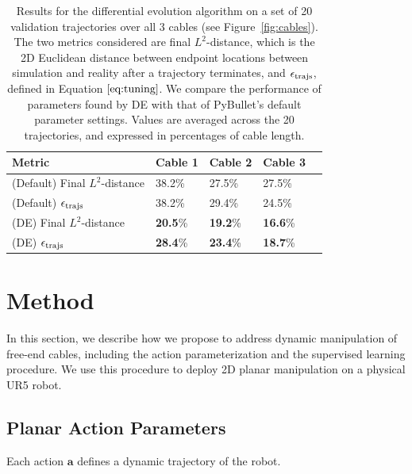 \documentclass[letterpaper, 10 pt, conference]{ieeeconf}  %
\newcommand{\ba}{\mathbf{a}}
\begin{document}
\begin{table}[t]
  \setlength\tabcolsep{5.0pt}
  \centering
  \caption{
    Results for the differential evolution algorithm on a set of 20 validation trajectories over all 3 cables (see Figure~\ref{fig:cables}). The two metrics considered are final $L^2$-distance, which is the 2D Euclidean distance between endpoint locations between simulation and reality after a trajectory terminates, and $\epsilon_{\rm trajs}$, defined in Equation $\ref{eq:tuning}$. We compare the performance of parameters found by DE with that of PyBullet's default parameter settings. Values are averaged across the 20 trajectories, and expressed in percentages of cable length.
  }
  \small
  \begin{tabular}{@{}lllll}
  \toprule
  Metric & Cable 1  & Cable 2  & Cable 3  \\
  \midrule
  (Default) Final $L^2$-distance & 38.2\% & 27.5\% & 27.5\% \\
  (Default) $\epsilon_{\rm trajs}$ & 38.2\% & 29.4\% & 24.5\% \\
  (DE) Final $L^2$-distance & \textbf{20.5}\%  & \textbf{19.2}\% & \textbf{16.6}\% \\
  (DE) $\epsilon_{\rm trajs}$ & \textbf{28.4}\% & \textbf{23.4}\% & \textbf{18.7}\% \\
  \toprule
  \end{tabular}
  \label{tab:tuning}
\end{table}  


\section{Method}\label{sec:method}

In this section, we describe how we propose to address dynamic manipulation of free-end cables, including the action parameterization and the supervised learning procedure. We use this procedure to deploy 2D planar manipulation on a physical UR5 robot.

\subsection{Planar Action Parameters}\label{ssec:action}

Each action $\ba$ defines a dynamic trajectory of the robot.

\end{document}
